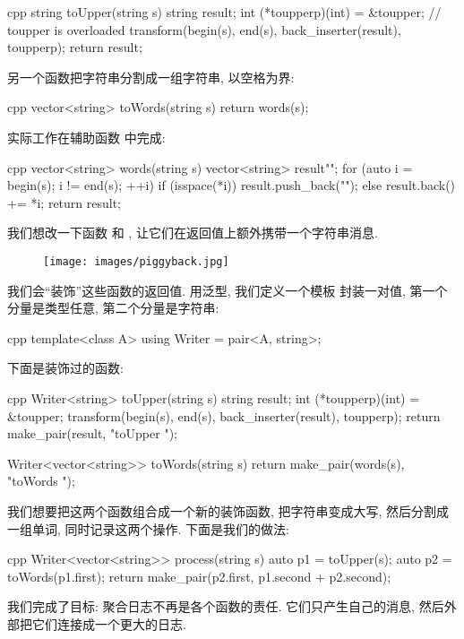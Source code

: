 \begin{snip}{cpp}
string toUpper(string s) {
    string result;
    int (*toupperp)(int) = &toupper; // toupper is overloaded
    transform(begin(s), end(s), back_inserter(result), toupperp);
    return result;
}
\end{snip}
另一个函数把字符串分割成一组字符串, 以空格为界:

\begin{snip}{cpp}
vector<string> toWords(string s) {
    return words(s);
}
\end{snip}
实际工作在辅助函数  中完成:

\begin{snip}{cpp}
vector<string> words(string s) {
    vector<string> result{""};
    for (auto i = begin(s); i != end(s); ++i)
    {
        if (isspace(*i))
            result.push_back("");
        else
            result.back() += *i;
    }
    return result;
}
\end{snip}

我们想改一下函数  和 , 让它们在返回值上额外携带一个字符串消息.

\begin{figure}[H]
  \centering
  \texttt{[image: images/piggyback.jpg]}
\end{figure}
\noindent
我们会``装饰''这些函数的返回值. 用泛型, 我们定义一个模板  封装一对值, 第一个分量是类型任意,
第二个分量是字符串:

\begin{snip}{cpp}
template<class A>
using Writer = pair<A, string>;
\end{snip}
下面是装饰过的函数:

\begin{snip}{cpp}
Writer<string> toUpper(string s) {
    string result;
    int (*toupperp)(int) = &toupper;
    transform(begin(s), end(s), back_inserter(result), toupperp);
    return make_pair(result, "toUpper ");
}

Writer<vector<string>> toWords(string s) {
    return make_pair(words(s), "toWords ");
}
\end{snip}
我们想要把这两个函数组合成一个新的装饰函数, 把字符串变成大写, 然后分割成一组单词, 同时记录这两个操作.
下面是我们的做法:

\begin{snip}{cpp}
Writer<vector<string>> process(string s) {
    auto p1 = toUpper(s);
    auto p2 = toWords(p1.first);
    return make_pair(p2.first, p1.second + p2.second);
}
\end{snip}
我们完成了目标: 聚合日志不再是各个函数的责任. 它们只产生自己的消息, 然后外部把它们连接成一个更大的日志.

